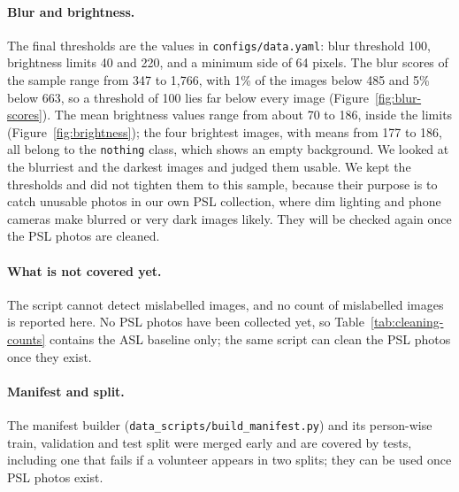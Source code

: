 \paragraph{Blur and brightness.} The final thresholds are the values in \texttt{configs/data.yaml}: blur threshold 100, brightness limits 40 and 220, and a minimum side of 64 pixels. The blur scores of the sample range from 347 to 1{,}766, with 1\% of the images below 485 and 5\% below 663, so a threshold of 100 lies far below every image (Figure~\ref{fig:blur-scores}). The mean brightness values range from about 70 to 186, inside the limits (Figure~\ref{fig:brightness}); the four brightest images, with means from 177 to 186, all belong to the \texttt{nothing} class, which shows an empty background. We looked at the blurriest and the darkest images and judged them usable. We kept the thresholds and did not tighten them to this sample, because their purpose is to catch unusable photos in our own PSL collection, where dim lighting and phone cameras make blurred or very dark images likely. They will be checked again once the PSL photos are cleaned.

\paragraph{What is not covered yet.} The script cannot detect mislabelled images, and no count of mislabelled images is reported here. No PSL photos have been collected yet, so Table~\ref{tab:cleaning-counts} contains the ASL baseline only; the same script can clean the PSL photos once they exist.

\paragraph{Manifest and split.} The manifest builder (\texttt{data\_scripts/build\_manifest.py}) and its person-wise train, validation and test split were merged early and are covered by tests, including one that fails if a volunteer appears in two splits; they can be used once PSL photos exist.


